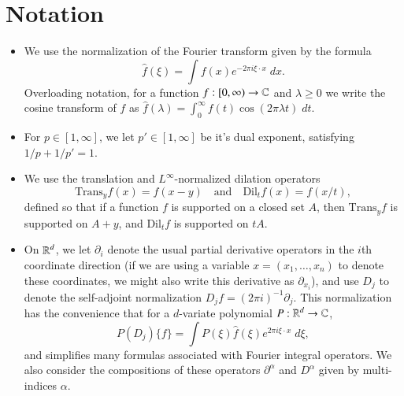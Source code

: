 
\chapter*{Notation} \label{not:not}

\vspace{-1em}

\begin{itemize}
    \item We use the normalization of the Fourier transform given by the formula
    \[ \widehat{f}(\xi) = \int f(x) e^{- 2 \pi i \xi \cdot x}\; dx. \]
    Overloading notation, for a function $f: [0,\infty) \to \operatorname{\mathbb{C}}$ and $\lambda \geq 0$ we write the cosine transform of $f$ as $\widehat{f}(\lambda) = \int_0^\infty f(t) \cos(2 \pi \lambda t)\; dt$.

    \item For $p \in [1,\infty]$, we let $p' \in [1,\infty]$ be it's dual exponent, satisfying $1/p + 1/p' = 1$.

    \item We use the translation and $L^\infty$-normalized dilation operators
    \[ \text{Trans}_y f(x) = f(x - y) \quad\text{and}\quad \text{Dil}_t f(x) = f(x/t), \]
    defined so that if a function $f$ is supported on a closed set $A$, then $\text{Trans}_y f$ is supported on $A + y$, and $\text{Dil}_t f$ is supported on $tA$. %

    \item On $\operatorname{\mathbb{R}}^d$, we let $\partial_i$ denote the usual partial derivative operators in the $i$th coordinate direction (if we are using a variable $x = (x_1,\dots,x_n)$ to denote these coordinates, we might also write this derivative as $\partial_{x_i}$), and use $D_j$ to denote the self-adjoint normalization $D_j f = (2 \pi i)^{-1} \partial_j$. This normalization has the convenience that for a $d$-variate polynomial $P: \operatorname{\mathbb{R}}^d \to \operatorname{\mathbb{C}}$,
    \[ P(D_j) \{ f \} = \int P(\xi) \widehat{f}(\xi) e^{2 \pi i \xi \cdot x}\; d\xi, \]
    and simplifies many formulas associated with Fourier integral operators. We also consider the compositions of these operators $\partial^\alpha$ and $D^\alpha$ given by multi-indices $\alpha$.


\end{itemize}
